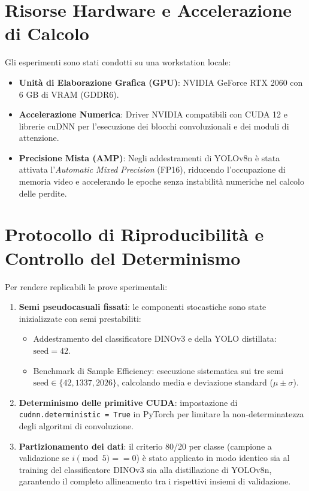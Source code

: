 \section{Risorse Hardware e Accelerazione di Calcolo}
\label{sec:app_hardware}
Gli esperimenti sono stati condotti su una workstation locale:
\begin{itemize}
    \item \textbf{Unità di Elaborazione Grafica (GPU)}: NVIDIA GeForce RTX 2060 con 6 GB di VRAM (GDDR6).
    \item \textbf{Accelerazione Numerica}: Driver NVIDIA compatibili con CUDA 12 e librerie cuDNN per l'esecuzione dei blocchi convoluzionali e dei moduli di attenzione.
    \item \textbf{Precisione Mista (AMP)}: Negli addestramenti di YOLOv8n è stata attivata l'\textit{Automatic Mixed Precision} (FP16), riducendo l'occupazione di memoria video e accelerando le epoche senza instabilità numeriche nel calcolo delle perdite.
\end{itemize}

\section{Protocollo di Riproducibilità e Controllo del Determinismo}
\label{sec:app_riproducibilita}
Per rendere replicabili le prove sperimentali:
\begin{enumerate}
    \item \textbf{Semi pseudocasuali fissati}: le componenti stocastiche sono state inizializzate con semi prestabiliti:
    \begin{itemize}
        \item Addestramento del classificatore DINOv3 e della YOLO distillata: $\text{seed} = 42$.
        \item Benchmark di Sample Efficiency: esecuzione sistematica sui tre semi $\text{seed} \in \{42, 1337, 2026\}$, calcolando media e deviazione standard ($\mu \pm \sigma$).
    \end{itemize}
    \item \textbf{Determinismo delle primitive CUDA}: impostazione di \texttt{cudnn.deterministic = True} in PyTorch per limitare la non-determinatezza degli algoritmi di convoluzione.
    \item \textbf{Partizionamento dei dati}: il criterio 80/20 per classe (campione a validazione se $i \pmod 5 == 0$) è stato applicato in modo identico sia al training del classificatore DINOv3 sia alla distillazione di YOLOv8n, garantendo il completo allineamento tra i rispettivi insiemi di validazione.
\end{enumerate}

